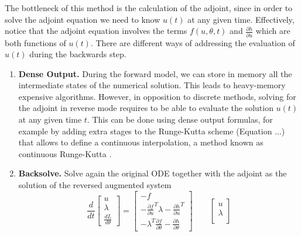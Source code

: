 The bottleneck of this method is the calculation of the adjoint, since in order to solve the adjoint equation we need to know $u(t)$ at any given time. 
Effectively, notice that the adjoint equation involves the terms $f(u, \theta, t)$ and $\frac{\partial h}{\partial u}$ which are both functions of $u(t)$. 
There are different ways of addressing the evaluation of $u(t)$ during the backwards step.
\begin{enumerate}[label=(\roman*)]
    \item \textbf{Dense Output.} During the forward model, we can store in memory all the intermediate states of the numerical solution. 
    This leads to heavy-memory expensive algorithms. 
    However, in opposition to discrete methods, solving for the adjoint in reverse mode requires to be able to evaluate the solution $u(t)$ at any given time $t$. 
    This can be done using dense output formulas, for example by adding extra stages to the Runge-Kutta scheme (Equation ...) that allows to define a continuous interpolation, a method known as continuous Runge-Kutta \cite{hairer-solving-2, Alexe_Sandu_2009}. 
    \item \textbf{Backsolve.} Solve again the original ODE together with the adjoint as the solution of the reversed augmented system \cite{chen_neural_2019}
    \begin{equation}
    \frac{d}{dt}
    \begin{bmatrix}
       u \\
       \lambda \\
       \frac{dL}{d\theta}
    \end{bmatrix}
    = 
    \begin{bmatrix}
       -f \\
       - \frac{\partial f}{\partial u}^T \lambda - \frac{\partial h}{\partial u}^T \\
       - \lambda^T \frac{\partial f}{\partial \theta} - \frac{\partial h}{\partial \theta}
    \end{bmatrix}
    \qquad 
    \begin{bmatrix}
       u \\
       \lambda \\

\end{bmatrix}
\end{equation}
\end{enumerate}
